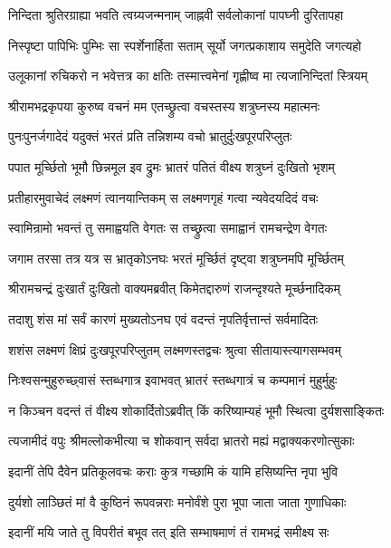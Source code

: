 \twolineshloka
{निन्दिता श्रुतिरग्राह्या भवति त्वग्र्यजन्मनाम्}
{जाह्नवी सर्वलोकानां पापघ्नी दुरितापहा}%

\twolineshloka
{निस्पृष्टा पापिभिः पुम्भिः सा स्पर्शेनार्हिता सताम्}
{सूर्यो जगत्प्रकाशाय समुदेति जगत्यहो}%

\twolineshloka
{उलूकानां रुचिकरो न भवेत्तत्र का क्षतिः}
{तस्मात्त्वमेनां गृह्णीष्व मा त्यजानिन्दितां स्त्रियम्}%

\twolineshloka
{श्रीरामभद्रकृपया कुरुष्व वचनं मम}
{एतच्छ्रुत्वा वचस्तस्य शत्रुघ्नस्य महात्मनः}%

\twolineshloka
{पुनःपुनर्जगादेदं यदुक्तं भरतं प्रति}
{तन्निशम्य वचो भ्रातुर्दुःखपूरपरिप्लुतः}%

\twolineshloka
{पपात मूर्च्छितो भूमौ छिन्नमूल इव द्रुमः}
{भ्रातरं पतितं वीक्ष्य शत्रुघ्नं दुःखितो भृशम्}%

\twolineshloka
{प्रतीहारमुवाचेदं लक्ष्मणं त्वानयान्तिकम्}
{स लक्ष्मणगृहं गत्वा न्यवेदयदिदं वचः}%


\twolineshloka
{स्वामिन्रामो भवन्तं तु समाह्वयति वेगतः}
{स तच्छ्रुत्वा समाह्वानं रामचन्द्रेण वेगतः}%

\twolineshloka
{जगाम तरसा तत्र यत्र स भ्रातृकोऽनघः}
{भरतं मूर्च्छितं दृष्ट्वा शत्रुघ्नमपि मूर्च्छितम्}%

\twolineshloka
{श्रीरामचन्द्रं दुःखार्तं दुःखितो वाक्यमब्रवीत्}
{किमेतद्दारुणं राजन्दृश्यते मूर्च्छनादिकम्}%

\twolineshloka
{तदाशु शंस मां सर्वं कारणं मुख्यतोऽनघ}
{एवं वदन्तं नृपतिर्वृत्तान्तं सर्वमादितः}%

\twolineshloka
{शशंस लक्ष्मणं क्षिप्रं दुःखपूरपरिप्लुतम्}
{लक्ष्मणस्तद्वचः श्रुत्वा सीतायास्त्यागसम्भवम्}%

\twolineshloka
{निःश्वसन्मुहुरुच्छ्वासं स्तब्धगात्र इवाभवत्}
{भ्रातरं स्तब्धगात्रं च कम्पमानं मुहुर्मुहुः}%

\twolineshloka
{न किञ्चन वदन्तं तं वीक्ष्य शोकार्दितोऽब्रवीत्}
{किं करिष्याम्यहं भूमौ स्थित्वा दुर्यशसाङ्कितः}%

\twolineshloka
{त्यजामीदं वपुः श्रीमल्लोकभीत्या च शोकवान्}
{सर्वदा भ्रातरो मह्यं मद्वाक्यकरणोत्सुकाः}%

\twolineshloka
{इदानीं तेपि दैवेन प्रतिकूलवचः कराः}
{कुत्र गच्छामि कं यामि हसिष्यन्ति नृपा भुवि}%

\twolineshloka
{दुर्यशो लाञ्छितं मां वै कुष्ठिनं रूपवन्नराः}
{मनोर्वंशे पुरा भूपा जाता जाता गुणाधिकाः}%

\twolineshloka
{इदानीं मयि जाते तु विपरीतं बभूव तत्}
{इति सम्भाषमाणं तं रामभद्रं समीक्ष्य सः}%

